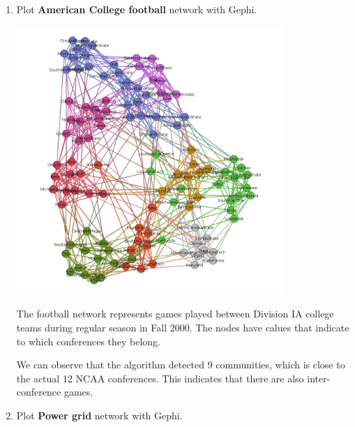 \documentclass{amsart}
\theoremstyle{definition}
\theoremstyle{remark}
\numberwithin{equation}{section}
\begin{document}
\begin{enumerate}
\begin{enumerate}
        \item Plot \textbf{American College football} network with Gephi. \vspace{0.5 cm}
        \centering
        \begin{minipage}{1\textwidth}
        \centering
        \includegraphics[width=0.8\textwidth]{images/football_v0.png} %
        \end{minipage}


        The football network represents games played between Division IA college teams during regular season in Fall 2000. The nodes have calues that indicate to which conferences they belong.
        
        We can observe that the algorithm detected 9 communities, which is close to the actual 12 NCAA conferences. This indicates that there are also inter-conference games. 

        \vspace{0.5 cm}

        \item Plot \textbf{Power grid} network with Gephi. \vspace{0.5 cm}


\end{enumerate}
\end{enumerate}
\end{document}
